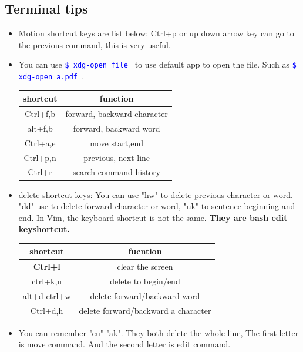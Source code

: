 \documentclass[a4paper,11pt,twoside]{book}
\newcommand{\linuxcommand}[1]{\texttt{\textcolor{blue}{\$ #1 \Pisymbol{psy}{191}}}}
\begin{document}
\subsection{Terminal tips}

\begin{itemize}

		\item Motion shortcut keys are list below: Ctrl+p or up down arrow key can go to the previous command, this is very useful. 

		\item You can use \linuxcommand{xdg-open file} to use default app to open the file. Such as \linuxcommand{xdg-open a.pdf}. 

\begin{center}
  \begin{tabular}{c|c}
 \hline shortcut & function \\
\hline Ctrl+f,b & forward, backward character \\
\hline alt+f,b & forward, backward word \\
\hline Ctrl+a,e & move start,end \\
\hline Ctrl+p,n & previous, next line \\
\hline Ctrl+r & search command history \\
 \hline
  \end{tabular}
\end{center}

		\item delete shortcut keys: You can use "hw" to delete previous character or word. "dd" use to delete forward character or word, "uk" to sentence beginning and end. In Vim, the keyboard shortcut is not the same. \textbf{They are bash edit keyshortcut.}

\begin{center}
  \begin{tabular}{|c|c|}
 \hline shortcut & fucntion \\
 \hline \textbf{Ctrl+l} & clear the screen \\	
\hline ctrl+k,u & delete to begin/end \\
\hline alt+d ctrl+w & delete forward/backward word \\
\hline Ctrl+d,h  & delete forward/backward a character  \\
 \hline
  \end{tabular}
\end{center}

		\item You can remember "eu" "ak". They both delete the whole line, The first letter is move command. And the second letter is edit command. 


\end{itemize}
\end{document}
